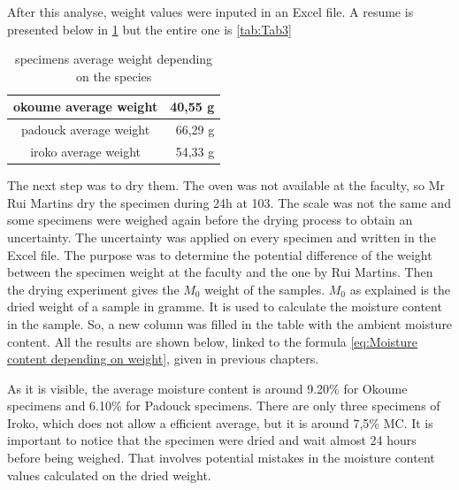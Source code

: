 After this analyse, weight values were inputed in an Excel file. A resume is presented below in \ref{tab:Tab1} but the entire one is \ref{tab:Tab3}

\begin {table}[h]
\centering
\begin{tabular}{|c|r|}
	\hline
	\cellcolor[rgb]{ .973,  .796,  .678}
	okoume average weight &
	\cellcolor[rgb]{ 1,  1,  1}
	40,55 g \\
	\hline
	\cellcolor[rgb]{ .776,  .349,  .067}
	padouck average weight &
	\cellcolor[rgb]{ 1,  1,  1}
	66,29 g \\
	\hline
	\cellcolor[rgb]{ .749,  .561,  0}
	iroko average weight &
	\cellcolor[rgb]{ 1,  1,  1}
	54,33 g
\end{tabular}
\caption[specimens average weight]{specimens average weight depending on the species}
\label{tab:Tab1}
\end{table}
The next step was to dry them. The oven was not available at the faculty, so Mr Rui Martins dry the specimen during 24h at 103\textcelsius. The scale was not the same and some specimens were weighed again before the drying process to obtain an uncertainty. The uncertainty was applied on every specimen and written in the Excel file. The purpose was to determine the potential difference of the weight between the specimen weight at the faculty and the one by Rui Martins. Then the drying experiment gives the $M_{0}$ weight of the samples. $M_{0}$ as explained is the dried weight of a sample in gramme. It is used to calculate the moisture content in the sample. So, a new column was filled in the table \label{tab:Tab3} with the ambient moisture content. All the results are shown below, linked to the formula \ref{eq:Moisture content depending on weight}, given in previous chapters.



As it is visible, the average moisture content is around 9.20\% for Okoume specimens and 6.10\% for Padouck specimens. There are only three specimens of Iroko, which does not allow a efficient average, but it is around 7,5\% MC. It is important to notice that the specimen were dried and wait almost 24 hours before being weighed. That involves potential mistakes in the moisture content values calculated on the dried weight.

